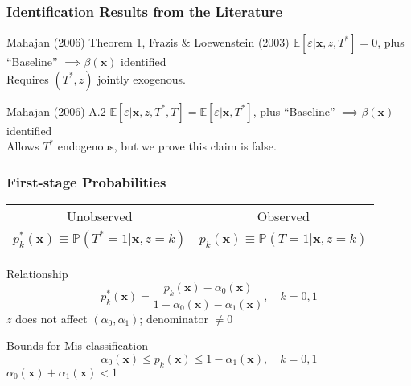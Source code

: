 \documentclass{beamer}
\begin{document}
\begin{frame}
  \frametitle{Identification Results from the Literature}

  \begin{block}{Mahajan (2006) Theorem 1, Frazis \& Loewenstein (2003)}
    $\mathbb{E}[\varepsilon|\mathbf{x},z,T^*] = 0$, plus ``Baseline'' $\implies \beta(\mathbf{x})$ identified\\
   \hfill \alert{Requires $(T^*,z)$ jointly exogenous.}
  \end{block}

  \begin{block}{Mahajan (2006) A.2}
    $\mathbb{E}[\varepsilon|\mathbf{x}, z, T^*, T] = \mathbb{E}[\varepsilon|\mathbf{x},T^*]$, plus ``Baseline'' $\implies \beta(\mathbf{x})$ identified\\
    \hfill \alert{Allows $T^*$ endogenous, but we prove this claim is false.}
  \end{block}


\end{frame}
\begin{frame}
  \frametitle{First-stage Probabilities} 

  \begin{table}[h]
    \centering
  \begin{tabular}[h]{|c|c|}
    \hline
   Unobserved & Observed \\
    $p^*_k(\mathbf{x}) \equiv \mathbb{P}(T^*=1|\mathbf{x}, z=k)$ & 
    $p_k(\mathbf{x}) \equiv \mathbb{P}(T=1|\mathbf{x}, z=k)$\\
    \hline
  \end{tabular}
\end{table}


  \begin{block}{Relationship}
    \vspace{-1em}
   \[
     p_k^*(\mathbf{x}) = \frac{p_k(\mathbf{x}) - \alpha_0(\mathbf{x})}{1 - \alpha_0(\mathbf{x}) - \alpha_1(\mathbf{x})}, \quad k = 0,1
   \]
   \hfill\alert{\footnotesize $z$ does not affect $(\alpha_0, \alpha_1)$; denominator $\neq 0$}
  \end{block}

  \normalsize
  \begin{block}{Bounds for Mis-classification}
    \vspace{-1em}
    \[
      \alpha_0(\mathbf{x}) \leq p_k(\mathbf{x}) \leq 1 - \alpha_1(\mathbf{x}), \quad k = 0,1
    \]
   \hfill \alert{\footnotesize$\alpha_0(\mathbf{x}) + \alpha_1(\mathbf{x}) <1$}
  \end{block}

\end{frame}
\end{document}

